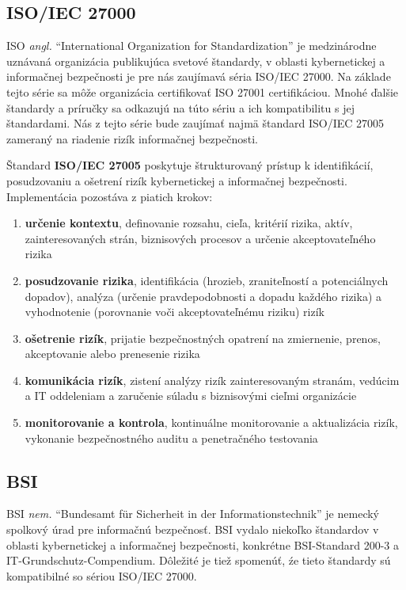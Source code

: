 \subsection*{ISO/IEC 27000}
ISO \textit{angl.} \enquote{International Organization for Standardization} je medzinárodne uznávaná organizácia publikujúca svetové štandardy, v oblasti
kybernetickej a informačnej bezpečnosti je pre nás zaujímavá séria ISO/IEC 27000\cite{iso_27000}. Na základe tejto série sa môže organizácia certifikovať
ISO 27001 certifikáciou. Mnohé ďalšie štandardy a príručky sa odkazujú na túto sériu a ich kompatibilitu s jej štandardami. Nás z tejto série bude zaujímať
najmä štandard ISO/IEC 27005\cite{iso_27005} zameraný na riadenie rizík informačnej bezpečnosti.

Štandard \textbf{ISO/IEC 27005} poskytuje štrukturovaný prístup k identifikácií, posudzovaniu a ošetrení rizík kybernetickej a informačnej bezpečnosti.
Implementácia pozostáva z piatich krokov:
\begin{enumerate}
    \item \textbf{určenie kontextu}, definovanie rozsahu, cieľa, kritérií rizika, aktív, zainteresovaných strán, biznisových procesov a určenie akceptovateľného rizika
    \item \textbf{posudzovanie rizika}, identifikácia (hrozieb, zraniteľností a potenciálnych dopadov), analýza (určenie pravdepodobnosti a dopadu každého rizika)
    a vyhodnotenie (porovnanie voči akceptovateľnému riziku) rizík 
    \item \textbf{ošetrenie rizík}, prijatie bezpečnostných opatrení na zmiernenie, prenos, akceptovanie alebo prenesenie rizika
    \item \textbf{komunikácia rizík}, zistení analýzy rizík zainteresovaným stranám, vedúcim a IT oddeleniam a zaručenie súladu s biznisovými cieľmi organizácie
    \item \textbf{monitorovanie a kontrola}, kontinuálne monitorovanie a aktualizácia rizík, vykonanie bezpečnostného auditu a penetračného testovania
\end{enumerate}

\subsection*{BSI}
BSI \textit{nem.} \enquote{Bundesamt für Sicherheit in der Informationstechnik} je nemecký spolkový úrad pre informačnú bezpečnosť. BSI vydalo niekoľko štandardov
v oblasti kybernetickej a informačnej bezpečnosti, konkrétne BSI-Standard 200-3\cite{bsi_200_3} a IT-Grundschutz-Compendium\cite{bsi_it_grundchutz_compendium}.
Dôležité je tiež spomenúť, źe tieto štandardy sú kompatibilné so sériou ISO/IEC 27000.

